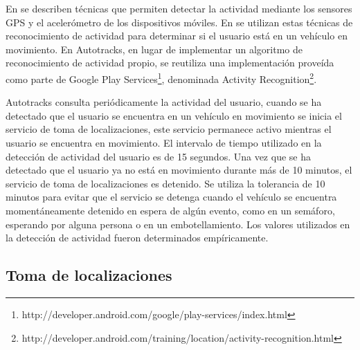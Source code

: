 En \cite{liao2006location,bao2004activity,ravi2005activity} se describen técnicas que permiten detectar la actividad mediante los sensores GPS y el acelerómetro de los dispositivos móviles. En \cite{thiagarajan2010cooperative} se utilizan estas técnicas de reconocimiento de actividad para determinar si el usuario está en un vehículo en movimiento. En Autotracks, en lugar de implementar un algoritmo de reconocimiento de actividad propio, se reutiliza una implementación proveída como parte de Google Play Services\footnote{http://developer.android.com/google/play-services/index.html}, denominada Activity Recognition\footnote{http://developer.android.com/training/location/activity-recognition.html}.

Autotracks consulta periódicamente la actividad del usuario, cuando se ha detectado que el usuario se encuentra en un vehículo en movimiento se inicia el servicio de toma de localizaciones, este servicio permanece activo mientras el usuario se encuentra en movimiento. El intervalo de tiempo utilizado en la detección de actividad del usuario es de 15 segundos. Una vez que se ha detectado que el usuario ya no está en movimiento durante más de 10 minutos, el servicio de toma de localizaciones es detenido. Se utiliza la tolerancia de 10 minutos para evitar que el servicio se detenga cuando el vehículo se encuentra momentáneamente detenido en espera de algún evento, como en un semáforo, esperando por alguna persona o en un embotellamiento. Los valores utilizados en la detección de actividad fueron determinados empíricamente.

\subsection{Toma de localizaciones}
\label{toma_localizaciones}

